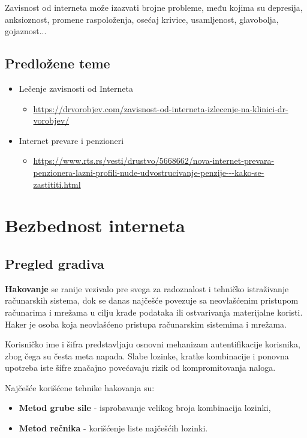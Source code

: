 \documentclass[a4paper, 12pt]{article}
\begin{document}
Zavisnost od interneta može izazvati brojne probleme, među kojima su depresija, anksioznost, promene raspoloženja, osećaj krivice, usamljenost, glavobolja, gojaznost...

\subsection{Predložene teme}

\begin{itemize}
    \item Lečenje zavisnosti od Interneta
    \begin{itemize}
        \item \url{https://drvorobjev.com/zavisnost-od-interneta-izlecenje-na-klinici-dr-vorobjev/}
    \end{itemize}
    \item Internet prevare i penzioneri
    \begin{itemize}
        \item \url{https://www.rts.rs/vesti/drustvo/5668662/nova-internet-prevara-penzionera-lazni-profili-nude-udvostrucivanje-penzije---kako-se-zastititi.html}
    \end{itemize}
    
\end{itemize}


\section{Bezbednost interneta}
\subsection{Pregled gradiva}
\textbf{Hakovanje} se ranije vezivalo pre svega za radoznalost i tehničko istraživanje
računarskih sistema, dok se danas najčešće povezuje sa neovlašćenim pristupom
računarima i mrežama u cilju krađe podataka ili ostvarivanja materijalne koristi.
Haker je osoba koja neovlašćeno pristupa računarskim sistemima i mrežama.

Korisničko ime i šifra predstavljaju osnovni mehanizam autentifikacije korisnika,
zbog čega su česta meta napada. Slabe lozinke, kratke kombinacije i ponovna upotreba
iste šifre značajno povećavaju rizik od kompromitovanja naloga.

Najčešće korišćene tehnike hakovanja su:
\begin{itemize}
    \item \textbf{Metod grube sile} - isprobavanje velikog broja kombinacija lozinki,
    \item \textbf{Metod rečnika} - korišćenje liste najčešćih lozinki.
\end{itemize}
\end{document}
